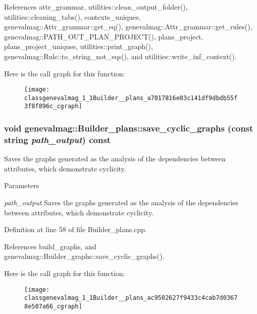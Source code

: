 References attr\_\-grammar, utilities::clean\_\-output\_\-folder(), utilities::cleaning\_\-tabs(), contexts\_\-uniques, genevalmag::Attr\_\-grammar::get\_\-eq(), genevalmag::Attr\_\-grammar::get\_\-rules(), genevalmag::PATH\_\-OUT\_\-PLAN\_\-PROJECT(), plans\_\-project, plans\_\-project\_\-uniques, utilities::print\_\-graph(), genevalmag::Rule::to\_\-string\_\-not\_\-eqs(), and utilities::write\_\-inf\_\-context().



Here is the call graph for this function:\nopagebreak
\begin{figure}[H]
\begin{center}
\leavevmode
\texttt{[image: classgenevalmag\_1\_1Builder\_\_plans\_a7017816e03c141df9dbdb55f3f8f896c\_cgraph]}
\end{center}
\end{figure}


\hypertarget{classgenevalmag_1_1Builder__plans_ac9502627f9433c4cab7d03678e507a66}{
\subsubsection[{save\_\-cyclic\_\-graphs}]{\setlength{\rightskip}{0pt plus 5cm}void genevalmag::Builder\_\-plans::save\_\-cyclic\_\-graphs (const string {\em path\_\-output}) const}}
\label{classgenevalmag_1_1Builder__plans_ac9502627f9433c4cab7d03678e507a66}
Saves the graphs generated as the analysis of the dependencies between attributes, which demonstrate cyclicity. 
\begin{DoxyParams}{Parameters}
\item[{\em path\_\-output}]Saves the graphs generated as the analysis of the dependencies between attributes, which demonstrate cyclicity. \end{DoxyParams}


Definition at line 58 of file Builder\_\-plans.cpp.



References build\_\-graphs, and genevalmag::Builder\_\-graphs::save\_\-cyclic\_\-graphs().



Here is the call graph for this function:\nopagebreak
\begin{figure}[H]
\begin{center}
\leavevmode
\texttt{[image: classgenevalmag\_1\_1Builder\_\_plans\_ac9502627f9433c4cab7d03678e507a66\_cgraph]}
\end{center}
\end{figure}




